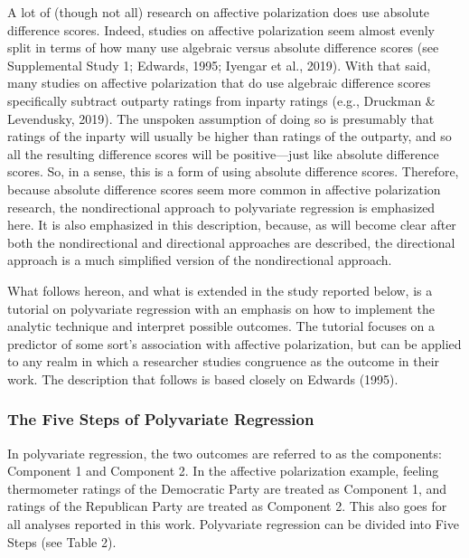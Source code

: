 \documentclass[authordate, meta]{jote-new-article}
\begin{document}
	A lot of (though not all) research on affective polarization does use absolute difference scores. Indeed, studies on affective polarization seem almost evenly split in terms of how many use algebraic versus absolute difference scores (see Supplemental Study 1; Edwards, 1995; Iyengar et al., 2019). With that said, many studies on affective polarization that do use algebraic difference scores specifically subtract outparty ratings from inparty ratings (e.g., Druckman \& Levendusky, 2019). The unspoken assumption of doing so is presumably that ratings of the inparty will usually be higher than ratings of the outparty, and so all the resulting difference scores will be positive—just like absolute difference scores. So, in a sense, this is a form of using absolute difference scores. Therefore, because absolute difference scores seem more common in affective polarization research, the nondirectional approach to polyvariate regression is emphasized here. It is also emphasized in this description, because, as will become clear after both the nondirectional and directional approaches are described, the directional approach is a much simplified version of the nondirectional approach.



	What follows hereon, and what is extended in the study reported below, is a tutorial on polyvariate regression with an emphasis on how to implement the analytic technique and interpret possible outcomes. The tutorial focuses on a predictor of some sort's association with affective polarization, but can be applied to any realm in which a researcher studies congruence as the outcome in their work. The description that follows is based closely on Edwards (1995).



	\subsubsection{The Five Steps of Polyvariate Regression}



	In polyvariate regression, the two outcomes are referred to as the components: Component 1 and Component 2. In the affective polarization example, feeling thermometer ratings of the Democratic Party are treated as Component 1, and ratings of the Republican Party are treated as Component 2. This also goes for all analyses reported in this work. Polyvariate regression can be divided into Five Steps (see Table 2).
\end{document}

